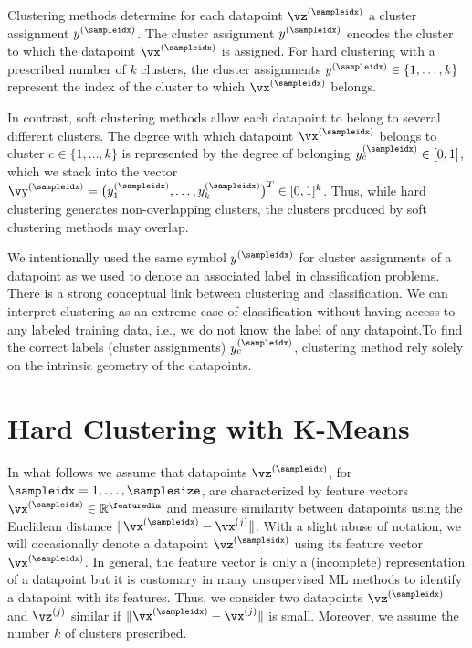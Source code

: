 \documentclass[12pt]{report}
\begin{document}
Clustering methods determine for each datapoint $\vz^{(\sampleidx)}$ 
a cluster assignment $y^{(\sampleidx)}$. The cluster assignment $y^{(\sampleidx)}$ 
encodes the cluster to which the datapoint $\vx^{(\sampleidx)}$ is assigned. 
For hard clustering with a prescribed number of $k$ clusters, the cluster assignments $y^{(\sampleidx)} \in \{1,\ldots,k\}$ 
represent the index of the cluster to which $\vx^{(\sampleidx)}$ belongs. 

In contrast, soft clustering methods allow each datapoint to belong to 
several different clusters. The degree with which datapoint $\vx^{(\sampleidx)}$ 
belongs to cluster $c \in \{1,\ldots,k\}$ is represented by the degree of 
belonging $y_{c}^{(\sampleidx)} \in [0,1]$, which we stack into the vector 
$\vy^{(\sampleidx)} = \big(y_{1}^{(\sampleidx)},\ldots,y_{k}^{(\sampleidx)}\big)^{T} \in [0,1]^{k}$. 
Thus, while hard clustering generates non-overlapping clusters, the 
clusters produced by soft clustering methods may overlap. 

We intentionally used the same symbol $y^{(\sampleidx)}$ for 
cluster assignments of a datapoint as we used to denote an 
associated label in classification problems. There is a strong 
conceptual link between clustering and classification. We can 
interpret clustering as an extreme case of classification without 
having access to any labeled training data, i.e., we do not 
know the label of any datapoint.To find the correct labels 
(cluster assignments) $y_{c}^{(\sampleidx)}$, clustering method 
rely solely on the intrinsic geometry of the datapoints. 

\newpage
\section{Hard Clustering with K-Means}
\label{sec_hard_clustering}

In what follows we assume that datapoints $\vz^{(\sampleidx)}$, for $\sampleidx=1,\ldots,\samplesize$, 
are characterized by feature vectors $\vx^{(\sampleidx)} \in \mathbb{R}^{\featuredim}$ and measure 
similarity between datapoints using the Euclidean distance $\| \vx^{(\sampleidx)} - \vx^{(j)} \|$. 
With a slight abuse of notation, we will occasionally denote a datapoint $\vz^{(\sampleidx)}$ 
using its feature vector $\vx^{(\sampleidx)}$. In general, the feature vector 
is only a (incomplete) representation of a datapoint but it is customary in 
many unsupervised ML methods to identify a datapoint with its features.
Thus, we consider two datapoints $\vz^{(\sampleidx)}$ and $\vz^{(j)}$ 
similar if $\| \vx^{(\sampleidx)} - \vx^{(j)} \|$ is small. Moreover, we assume 
the number $k$ of clusters prescribed. 
\end{document}
